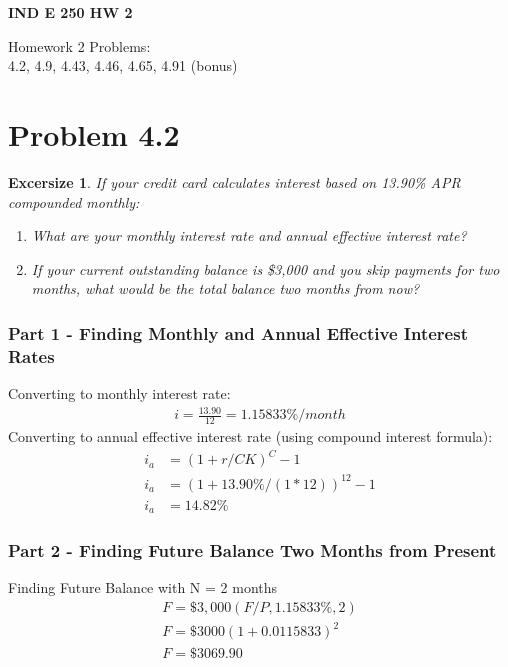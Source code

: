 \documentclass{report} %
\newtheorem{exrc}{Excersize}
\begin{document}
\newpage

\begin{center}
    \LARGE{\textbf{IND E 250 HW 2}}
\end{center}
\begin{center}
    Homework 2 Problems: \\
    4.2, 4.9, 4.43, 4.46, 4.65, 4.91 (bonus)
\end{center}
\section*{Problem 4.2}
\begin{exrc}
    If your credit card calculates interest based on 13.90\% APR compounded monthly:
    \begin{enumerate}
        \item What are your monthly interest rate and annual effective interest rate?
        \item If your current outstanding balance is \$3,000 and you skip payments for two months, what would be the total balance two months from now?
    \end{enumerate}
\end{exrc}
\subsubsection*{Part 1 - Finding Monthly and Annual Effective Interest Rates}
Converting to monthly interest rate:
\begin{equation*}
    \begin{aligned}
        i = \frac{13.90}{12} = 1.15833\%/month
    \end{aligned}
\end{equation*}
Converting to annual effective interest rate (using compound interest formula):
\begin{equation*}
    \begin{aligned}
        i_a &= (1 + r/CK)^C - 1 \\
        i_a &= (1 + 13.90\%/(1*12))^{12} - 1 \\
        i_a &= 14.82\%
    \end{aligned}
\end{equation*}
\subsubsection*{Part 2 - Finding Future Balance Two Months from Present}
Finding Future Balance with N = 2 months
\begin{equation*}
    \begin{aligned}
        F = \$3,000(F/P,1.15833\%,2) \\
        F = \$3000(1 + 0.0115833)^2 \\
        F = \$3069.90 
    \end{aligned}
\end{equation*}
\end{document}

